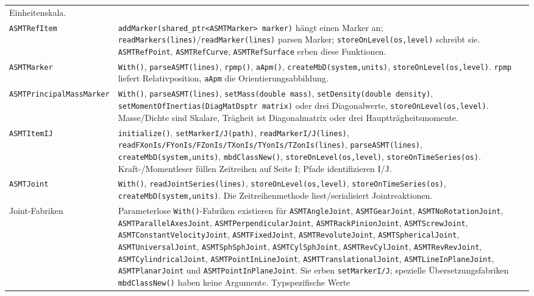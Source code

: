\documentclass[
  12pt
]{book}
\begin{document}
\begin{longtable}[]{@{}
  >{\raggedright\arraybackslash}p{}
  >{\raggedright\arraybackslash}p{}@{}}
Einheitenskala. \\
\texttt{ASMTRefItem} &
\texttt{addMarker(shared\_ptr\textless{}ASMTMarker\textgreater{}\ marker)}
hängt einen Marker an;
\texttt{readMarkers(lines)}/\texttt{readMarker(lines)} parsen Marker;
\texttt{storeOnLevel(os,level)} schreibt sie. \texttt{ASMTRefPoint},
\texttt{ASMTRefCurve}, \texttt{ASMTRefSurface} erben diese
Funktionen. \\
\texttt{ASMTMarker} & \texttt{With()}, \texttt{parseASMT(lines)},
\texttt{rpmp()}, \texttt{aApm()}, \texttt{createMbD(system,units)},
\texttt{storeOnLevel(os,level)}. \texttt{rpmp} liefert Relativposition,
\texttt{aApm} die Orientierungsabbildung. \\
\texttt{ASMTPrincipalMassMarker} & \texttt{With()},
\texttt{parseASMT(lines)}, \texttt{setMass(double\ mass)},
\texttt{setDensity(double\ density)},
\texttt{setMomentOfInertias(DiagMatDsptr\ matrix)} oder drei
Diagonalwerte, \texttt{storeOnLevel(os,level)}. Masse/Dichte sind
Skalare, Trägheit ist Diagonalmatrix oder drei Hauptträgheitsmomente. \\
\texttt{ASMTItemIJ} & \texttt{initialize()},
\texttt{setMarkerI/J(path)}, \texttt{readMarkerI/J(lines)},
\texttt{readFXonIs/FYonIs/FZonIs/TXonIs/TYonIs/TZonIs(lines)},
\texttt{parseASMT(lines)}, \texttt{createMbD(system,units)},
\texttt{mbdClassNew()}, \texttt{storeOnLevel(os,level)},
\texttt{storeOnTimeSeries(os)}. Kraft-/Momentleser füllen Zeitreihen auf
Seite I; Pfade identifizieren I/J. \\
\texttt{ASMTJoint} & \texttt{With()}, \texttt{readJointSeries(lines)},
\texttt{storeOnLevel(os,level)}, \texttt{storeOnTimeSeries(os)},
\texttt{createMbD(system,units)}. Die Zeitreihenmethode
liest/serialisiert Jointreaktionen. \\
Joint-Fabriken & Parameterlose \texttt{With()}-Fabriken existieren für
\texttt{ASMTAngleJoint}, \texttt{ASMTGearJoint},
\texttt{ASMTNoRotationJoint}, \texttt{ASMTParallelAxesJoint},
\texttt{ASMTPerpendicularJoint}, \texttt{ASMTRackPinionJoint},
\texttt{ASMTScrewJoint}, \texttt{ASMTConstantVelocityJoint},
\texttt{ASMTFixedJoint}, \texttt{ASMTRevoluteJoint},
\texttt{ASMTSphericalJoint}, \texttt{ASMTUniversalJoint},
\texttt{ASMTSphSphJoint}, \texttt{ASMTCylSphJoint},
\texttt{ASMTRevCylJoint}, \texttt{ASMTRevRevJoint},
\texttt{ASMTCylindricalJoint}, \texttt{ASMTPointInLineJoint},
\texttt{ASMTTranslationalJoint}, \texttt{ASMTLineInPlaneJoint},
\texttt{ASMTPlanarJoint} und \texttt{ASMTPointInPlaneJoint}. Sie erben
\texttt{setMarkerI/J}; spezielle Übersetzungsfabriken
\texttt{mbdClassNew()} haben keine Argumente. Typspezifische Werte

\end{longtable}
\end{document}
